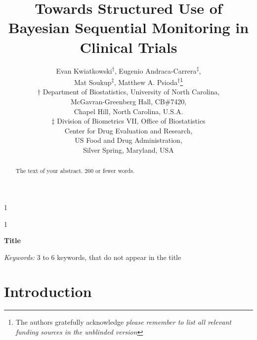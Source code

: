 \documentclass[12pt]{article}
\newcommand{\blind}{1}
\begin{document}
%

\def\spacingset#1{\renewcommand{\baselinestretch}%
{#1}\small\normalsize} \spacingset{1}



\blind
{
  \title{\bf Towards Structured Use of Bayesian Sequential Monitoring in Clinical Trials}
  \author{Evan Kwiatkowski\textsuperscript{$\dagger$}, 
	        Eugenio Andraca-Carrera\textsuperscript{$\ddagger$},\\
					Mat Soukup\textsuperscript{$\ddagger$},
					\medskip Matthew A. Psioda\textsuperscript{$\dagger$}\thanks{The authors gratefully acknowledge \textit{please remember to list all relevant funding sources in the unblinded version}}\\
	  $\dagger$ Department of Biostatistics,
		University of North Carolina, \\
		McGavran-Greenberg Hall, CB\#7420, \\
		\medskip Chapel Hill, North Carolina, U.S.A.\\
    $\ddagger$ Division of Biometrics VII, Office of Biostatistics \\
		           Center for Drug Evaluation and Research, \\
							 US Food and Drug Administration, \\
							 Silver Spring, Maryland, USA \\									
		}
  \maketitle
} \fi

\blind
{
  \bigskip
  \bigskip
  \bigskip
  \begin{center}
    {\LARGE\bf Title}
\end{center}
  \medskip
} \fi

\bigskip
\begin{abstract}
The text of your abstract. 200 or fewer words.
\end{abstract}

\noindent%
{\it Keywords:}  3 to 6 keywords, that do not appear in the title
\vfill

\newpage
\spacingset{1.5} %



\section{Introduction}
\end{document}
